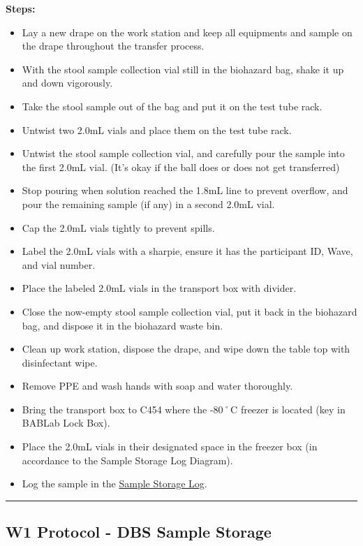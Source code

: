 \documentclass[
]{book}
\providecommand{\tightlist}{%
  \setlength{\itemsep}{0pt}\setlength{\parskip}{0pt}}
\begin{document}
\textbf{Steps:}

\begin{itemize}
\tightlist
\item
  Lay a new drape on the work station and keep all equipments and sample on the drape throughout the transfer process.
\item
  With the stool sample collection vial still in the biohazard bag, shake it up and down vigorously.
\item
  Take the stool sample out of the bag and put it on the test tube rack.
\item
  Untwist two 2.0mL vials and place them on the test tube rack.
\item
  Untwist the stool sample collection vial, and carefully pour the sample into the first 2.0mL vial. (It's okay if the ball does or does not get transferred)
\item
  Stop pouring when solution reached the 1.8mL line to prevent overflow, and pour the remaining sample (if any) in a second 2.0mL vial.
\item
  Cap the 2.0mL vials tightly to prevent spills.
\item
  Label the 2.0mL vials with a sharpie, ensure it has the participant ID, Wave, and vial number.
\item
  Place the labeled 2.0mL vials in the transport box with divider.
\item
  Close the now-empty stool sample collection vial, put it back in the biohazard bag, and dispose it in the biohazard waste bin.
\item
  Clean up work station, dispose the drape, and wipe down the table top with disinfectant wipe.
\item
  Remove PPE and wash hands with soap and water thoroughly.
\item
  Bring the transport box to C454 where the -80˚C freezer is located (key in BABLab Lock Box).
\item
  Place the 2.0mL vials in their designated space in the freezer box (in accordance to the Sample Storage Log Diagram).
\item
  Log the sample in the \href{https://app.box.com/file/630322897864}{Sample Storage Log}.
\end{itemize}

\begin{center}\rule{0.5\linewidth}{0.5pt}\end{center}

\hypertarget{w1-protocol---dbs-sample-storage}{%
\subsection{W1 Protocol - DBS Sample Storage}\label{w1-protocol---dbs-sample-storage}}
\end{document}
